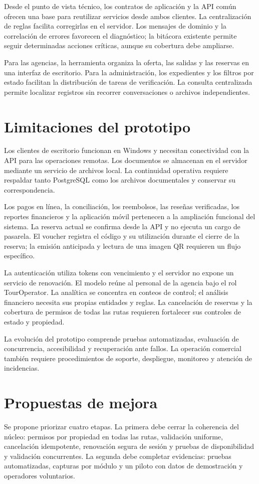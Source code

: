 Desde el punto de vista técnico, los contratos de aplicación y la API común ofrecen una base para reutilizar servicios desde ambos clientes. La centralización de reglas facilita corregirlas en el servidor. Los mensajes de dominio y la correlación de errores favorecen el diagnóstico; la bitácora existente permite seguir determinadas acciones críticas, aunque su cobertura debe ampliarse.

Para las agencias, la herramienta organiza la oferta, las salidas y las reservas en una interfaz de escritorio. Para la administración, los expedientes y los filtros por estado facilitan la distribución de tareas de verificación. La consulta centralizada permite localizar registros sin recorrer conversaciones o archivos independientes.

\section{Limitaciones del prototipo}
Los clientes de escritorio funcionan en Windows y necesitan conectividad con la API para las operaciones remotas. Los documentos se almacenan en el servidor mediante un servicio de archivos local. La continuidad operativa requiere respaldar tanto PostgreSQL como los archivos documentales y conservar su correspondencia.

Los pagos en línea, la conciliación, los reembolsos, las reseñas verificadas, los reportes financieros y la aplicación móvil pertenecen a la ampliación funcional del sistema. La reserva actual se confirma desde la API y no ejecuta un cargo de pasarela. El voucher registra el código y su utilización durante el cierre de la reserva; la emisión anticipada y lectura de una imagen QR requieren un flujo específico.

La autenticación utiliza tokens con vencimiento y el servidor no expone un servicio de renovación. El modelo reúne al personal de la agencia bajo el rol TourOperator. La analítica se concentra en conteos de control; el análisis financiero necesita sus propias entidades y reglas. La cancelación de reservas y la cobertura de permisos de todas las rutas requieren fortalecer sus controles de estado y propiedad.

La evolución del prototipo comprende pruebas automatizadas, evaluación de concurrencia, accesibilidad y recuperación ante fallos. La operación comercial también requiere procedimientos de soporte, despliegue, monitoreo y atención de incidencias.

\section{Propuestas de mejora}
Se propone priorizar cuatro etapas. La primera debe cerrar la coherencia del núcleo: permisos por propiedad en todas las rutas, validación uniforme, cancelación idempotente, renovación segura de sesión y pruebas de disponibilidad y validación concurrentes. La segunda debe completar evidencias: pruebas automatizadas, capturas por módulo y un piloto con datos de demostración y operadores voluntarios.

